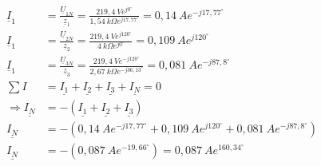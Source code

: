 \begin{enumerate}[label=\alph*)]
	\begin{align*}
		\underline{I}_{1} &= \frac{\underline{U}_{1N}}{\underline{z}_{1}} = 
    	\frac{219,4\ Ve^{j0^\circ}}{1,54\ k\Omega e^{j17,77^\circ}}=0,14\ Ae^{-j17,77^\circ}\\ 
 		\underline{I}_{1} &= \frac{\underline{U}_{2N}}{\underline{z}_{2}} = 
    	\frac{219,4\ Ve^{j120^\circ}}{4\ k\Omega e^{j0^\circ}}=0,109\ Ae^{j120^\circ}\\ 
		\underline{I}_{1} &= \frac{\underline{U}_{3N}}{\underline{z}_{3}} = 
    	\frac{219,4\ Ve^{-j120^\circ}}{2,67\ k\Omega e^{-j36,13^\circ}}=0,081\ Ae^{-j87,8^\circ}\\
		\sum I &= \underline{I_1}+\underline{I_2}+\underline{I_3}+\underline{I_N}=0\\
		\Rightarrow \underline{I_N}&=-(\underline{I_1}+\underline{I_2}+\underline{I_3})\\
    	\underline{I_N} &= -(0,14\ Ae^{-j17,77^\circ}+0,109\ Ae^{j120^\circ}+0,081\ Ae^{-j87,8^\circ})\\ 
    	\underline{I_N} &= -(0,087\ Ae^{-19,66^\circ})=0,087\ Ae^{160,34^\circ}
  \end{align*}


\end{enumerate}
